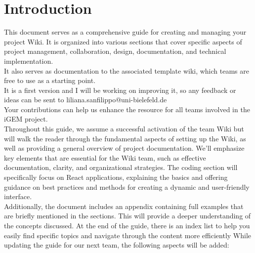 \documentclass[a4paper, 11pt, twoside]{book}
\begin{document}
\pagecolor{pagecolor}
\frontmatter

\tableofcontents
\newpage


\pagecolor{pagecolor}


\section{Introduction}
This document serves as a comprehensive guide for creating and managing your project Wiki. It is organized into various sections that cover specific aspects of project management, collaboration, design, documentation, and technical implementation. \\
It also serves as documentation to the associated template wiki, which teams are free to use as a starting point. \\ \newline
It is a first version and I will be working on improving it, so any feedback or ideas can be sent to liliana.sanfilippo@uni-bielefeld.de \\
Your contributions can help us enhance the resource for all teams involved in the iGEM project. \\ \newline
Throughout this guide, we assume a successful activation of the team Wiki but will walk the reader through the fundamental aspects of setting up the Wiki, as well as providing a general overview of project documentation. We'll emphasize key elements that are essential for the Wiki team, such as effective documentation, clarity, and organizational strategies. The coding section will specifically focus on React applications, explaining the basics and offering guidance on best practices and methods for creating a dynamic and user-friendly interface. \\ \newline
Additionally, the document includes an appendix containing full examples that are briefly mentioned in the sections. This will provide a deeper understanding of the concepts discussed. At the end of the guide, there is an index list to help you easily find specific topics and navigate through the content more efficiently
While updating the guide for our next team, the following aspects will be added:
\end{document}
